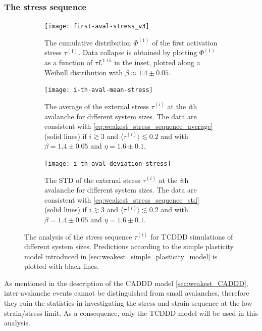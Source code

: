 \subsubsection{The stress sequence}
\begin{figure}[htbp!] 
  \centering
  \begin{subfigure}[b]{0.48\textwidth}
    \texttt{[image: first-aval-stress\_v3]}
    \caption{The cumulative distribution $\Phi^{(1)}$ of the first activation stress $\tau^{(1)}$. Data collapse is obtained by plotting $\Phi^{(1)}$ as a function of $\tau L^{1.15}$ in the inset, plotted along a Weibull distribution with $\beta \approx 1.4 \pm 0.05$.}
    \label{fig:weakest_tau_i_tacdda}   
  \end{subfigure}           \hspace{0.01\textwidth}
  \begin{subfigure}[b]{0.48\textwidth} 
    \texttt{[image: i-th-aval-mean-stress]}
    \caption{The average of the external stress $\tau^{(i)}$ at the \textit{i}th avalanche for different system sizes. The data are consistent with \cref{eq:weakest_stress_sequence_average} (solid lines) if $i\gtrsim3$ and $\langle \tau^{(i)}\rangle \lesssim 0.2$ and with $\beta = 1.4 \pm 0.05$ and $\eta = 1.6 \pm 0.1$.}
    \label{fig:weakest_tau_i_tacddb}   
  \end{subfigure}             
  \begin{subfigure}[b]{0.48\textwidth}
    \texttt{[image: i-th-aval-deviation-stress]}
    \caption{The STD of the external stress $\tau^{(i)}$ at the \textit{i}th avalanche for different system sizes. The data are consistent with \cref{eq:weakest_stress_sequence_std} (solid lines) if $i\gtrsim3$ and $\langle \tau^{(i)}\rangle \lesssim 0.2$ and with $\beta = 1.4 \pm 0.05$ and $\eta = 1.6 \pm 0.1$.}
    \label{fig:weakest_tau_i_tacddc}
  \end{subfigure}
  \caption[Stress sequences for the TCDDD]{The analysis of the stress sequence $\tau^{(i)}$ for TCDDD simulations of different system sizes. Predictions according to the simple plasticity model introduced in \ref{sec:weakest_simple_plasticity_model} is plotted with black lines.}
  \label{fig:weakest_tau_i_tacdd}
\end{figure}


As mentioned in the description of the CADDD model \ref{sec:weakest_CADDD}, inter-avalanche events cannot be distinguished from small avalanches, therefore they ruin the statistics in investigating the stress and strain sequence at the low strain/stress limit. As a consequence, only the TCDDD model will be used in this analysis.

